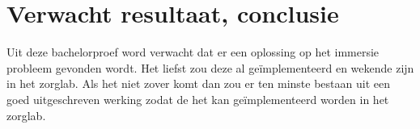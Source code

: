 %
%
%
%
%

\section{Verwacht resultaat, conclusie}%
\label{sec:verwachte_resultaten}

Uit deze bachelorproef word verwacht dat er een oplossing op het immersie probleem gevonden wordt. Het liefst zou deze al geïmplementeerd en wekende zijn in het zorglab. Als het niet zover komt dan zou er ten minste bestaan uit een goed uitgeschreven werking zodat de het kan geïmplementeerd worden in het zorglab.

%
%

